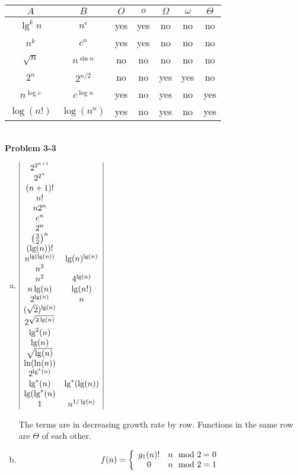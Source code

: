 \documentclass{article}
\begin{document}
\begin{tabular}{c|c|c|c|c|c|c|}
$A$ & $B$ & $O$ & $o$ & $\Omega$ & $\omega$ & $\Theta$ \\ \hline
$\lg^k n$ & $n^\epsilon$ & yes & yes & no & no & no \\ \hline
$n^k$ & $c^n$ & yes & yes & no & no & no \\ \hline 
$\sqrt{n}$ & $n^{\sin n}$ & no & no & no & no & no \\ \hline
$2^n$ & $2^{n/2}$ & no & no & yes & yes & no \\ \hline
$n^{\log c}$ & $c^{\log n}$ & yes & no & yes & no & yes \\ \hline
$\log(n!)$ & $\log(n^n)$ & yes & no & yes & no & yes \\ \hline
\end{tabular} \\

\noindent\textbf{Problem 3-3}\\
\begin{enumerate}[a.]
\item
$
\begin{array}{|c c|}
2^{2^{n+1}}&\\
2^{2^n}&\\
(n+1)!&\\
n!&\\
n2^n&\\
e^n&\\
2^n&\\
\left(\frac{3}{2}\right)^n&\\
(\lg(n))!&\\
 n^{\lg(\lg(n))}&\lg(n)^{\lg(n)}\\
 n^3&\\
  n^2& 4^{\lg(n)}\\
  n\lg(n)&\lg(n!)\\
  2^{\lg(n)}&n\\
  (\sqrt{2})^{\lg(n)}&\\
  2^{\sqrt{2\lg(n)}}&\\
  \lg^2(n)&\\
  \lg(n)&\\
  \sqrt{\lg(n)}&\\
  \ln(\ln(n))&\\
  2^{\lg^*(n)}&\\
  \lg^*(n) &\lg^*(\lg(n))\\
  \lg(\lg^*(n)&\\
  1&n^{1/\lg(n)}

\end{array}
$


The terms are in decreasing growth rate by row. Functions in the same row are $\Theta$ of each other.
\item

\[
f(n) = \left\{\begin{array}{c c}g_1(n)!& n\mod 2=0 \\0 &n\mod 2 =1\end{array}\right.
\]
\end{enumerate}
\end{document}

